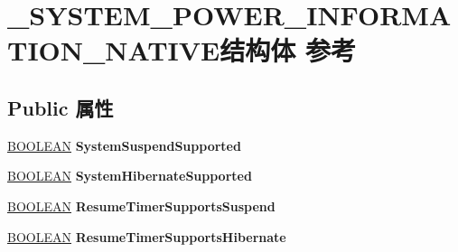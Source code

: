 \hypertarget{struct___s_y_s_t_e_m___p_o_w_e_r___i_n_f_o_r_m_a_t_i_o_n___n_a_t_i_v_e}{}\section{\+\_\+\+S\+Y\+S\+T\+E\+M\+\_\+\+P\+O\+W\+E\+R\+\_\+\+I\+N\+F\+O\+R\+M\+A\+T\+I\+O\+N\+\_\+\+N\+A\+T\+I\+V\+E结构体 参考}
\label{struct___s_y_s_t_e_m___p_o_w_e_r___i_n_f_o_r_m_a_t_i_o_n___n_a_t_i_v_e}
\subsection*{Public 属性}
\begin{DoxyCompactItemize}
\item 
\mbox{\label{struct___s_y_s_t_e_m___p_o_w_e_r___i_n_f_o_r_m_a_t_i_o_n___n_a_t_i_v_e_aca4474420e9aecef0282be27abf2e3fe}} 
\hyperlink{_processor_bind_8h_a112e3146cb38b6ee95e64d85842e380a}{B\+O\+O\+L\+E\+AN} {\bfseries System\+Suspend\+Supported}
\item 
\mbox{\label{struct___s_y_s_t_e_m___p_o_w_e_r___i_n_f_o_r_m_a_t_i_o_n___n_a_t_i_v_e_a9249bf54ea25aaf273b6dbc832e6fd18}} 
\hyperlink{_processor_bind_8h_a112e3146cb38b6ee95e64d85842e380a}{B\+O\+O\+L\+E\+AN} {\bfseries System\+Hibernate\+Supported}
\item 
\mbox{\label{struct___s_y_s_t_e_m___p_o_w_e_r___i_n_f_o_r_m_a_t_i_o_n___n_a_t_i_v_e_aa0c8cf8b85e2970e00f90f99346f1762}} 
\hyperlink{_processor_bind_8h_a112e3146cb38b6ee95e64d85842e380a}{B\+O\+O\+L\+E\+AN} {\bfseries Resume\+Timer\+Supports\+Suspend}
\item 
\mbox{\label{struct___s_y_s_t_e_m___p_o_w_e_r___i_n_f_o_r_m_a_t_i_o_n___n_a_t_i_v_e_a6df8668337f9ef2c54b6b1a3bf23ad80}} 
\hyperlink{_processor_bind_8h_a112e3146cb38b6ee95e64d85842e380a}{B\+O\+O\+L\+E\+AN} {\bfseries Resume\+Timer\+Supports\+Hibernate}
\item 

\end{DoxyCompactItemize}
